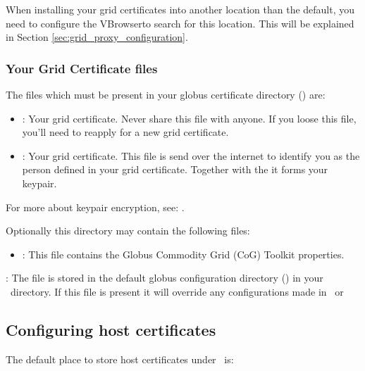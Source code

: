  	 \tab {}
 
 When installing your grid certificates into another location than the default, 
 you need to configure the VBrowserto search for this location. 
 This will be explained in Section \ref{sec:grid_proxy_configuration}. 
 
\subsubsection{Your Grid Certificate files}

 The files which must be present in your globus certificate directory
 () are:

 \begin{itemize} 
   \item {} : 
     Your  grid certificate. Never share this file with anyone. If you 
     loose this file, you'll need to reapply for a new grid certificate. 
   \item {} : 
     Your  grid certificate. This file is send over the internet to 
     identify you as the person defined in your grid certificate. Together
     with the  it forms your  keypair. 
  \end{itemize} 
  
 For more about  keypair encryption, see: \cite{PKCS}.
 
 Optionally this directory may contain the following files: 

 \begin{itemize} 
   \item {} : 
     This file contains the Globus Commodity Grid (CoG) Toolkit properties.
 \end{itemize} 
 
 : The  file is  stored in the default
 globus configuration directory () in your \HOME\ directory. If this 
 file is present it will override any configurations made in \VLETCONF\ or 

\subsection{Configuring host certificates} 

The default place to store host certificates under \Linux\ is:\\

